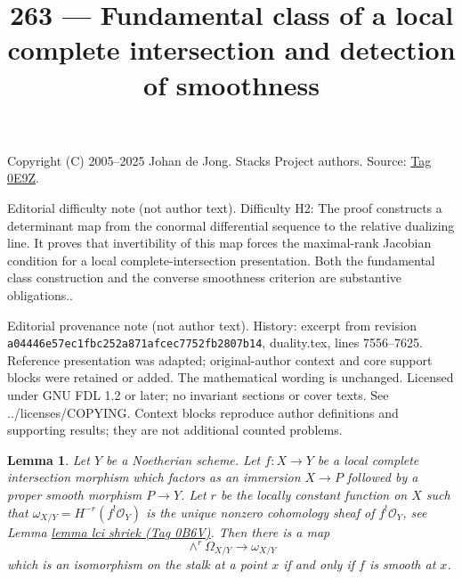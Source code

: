 \documentclass{amsart}
\theoremstyle{plain}
\newtheorem{lemma}[subsection]{Lemma}
\theoremstyle{definition}
\theoremstyle{remark}
\numberwithin{equation}{subsection}
\begin{document}
\title[Stacks Project, Tag 0E9Z]{263 --- Fundamental class of a local complete intersection and detection of smoothness}
\maketitle
\noindent Copyright (C) 2005--2025 Johan de Jong. Stacks Project authors. Source: \href{https://stacks.math.columbia.edu/tag/0E9Z}{Tag 0E9Z}.

\noindent Editorial difficulty note (not author text). Difficulty H2: The proof constructs a determinant map from the conormal differential sequence to the relative dualizing line. It proves that invertibility of this map forces the maximal-rank Jacobian condition for a local complete-intersection presentation. Both the fundamental class construction and the converse smoothness criterion are substantive obligations..

\noindent Editorial provenance note (not author text). History: excerpt from revision \texttt{a0444\allowbreak 6e57e\allowbreak c1fbc\allowbreak 252a8\allowbreak 71afc\allowbreak ec775\allowbreak 2fb28\allowbreak 07b14}, duality.tex, lines 7556--7625. Reference presentation was adapted; original-author context and core support blocks were retained or added. The mathematical wording is unchanged. Licensed under GNU FDL 1.2 or later; no invariant sections or cover texts. See ../licenses/COPYING. Context blocks reproduce author definitions and supporting results; they are not additional counted problems.

\begin{lemma}
\label{lemma-fundamental-class-lci}
Let $Y$ be a Noetherian scheme. Let $f : X \to Y$ be a
local complete intersection morphism which factors
as an immersion $X \to P$ followed by a proper smooth morphism $P \to Y$.
Let $r$ be the locally constant function on
$X$ such that $\omega_{X/Y} = H^{-r}(f^!\mathcal{O}_Y)$
is the unique nonzero cohomology sheaf of $f^!\mathcal{O}_Y$, see
Lemma \href{https://stacks.math.columbia.edu/tag/0B6V}{lemma lci shriek (Tag 0B6V)}.
Then there is a map
$$
\wedge^r\Omega_{X/Y} \longrightarrow \omega_{X/Y}
$$
which is an isomorphism on the stalk at a point $x$ if and only
if $f$ is smooth at $x$.
\end{lemma}
\end{document}
